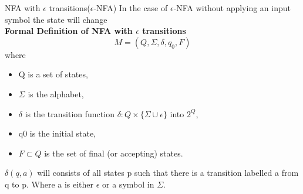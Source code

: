 \documentclass{beamer}
\begin{document}
\begin{frame}{NFA with $\epsilon$ transitions($\epsilon$-NFA)}
	In the case of $\epsilon$-NFA without applying an input symbol the state will change
	\\
	\textbf{Formal Definition of NFA with $\epsilon$ transitions}
	$$ 	M=(Q,\Sigma,\delta,q_0,F) $$
	where
	\begin{itemize}
		\item Q is a set of states,
		\item $\Sigma$ is the alphabet, 
		\item $\delta$ is the transition function $\delta: Q\times \{\Sigma \cup \epsilon \} $ into $2^Q$, 
		\item q0 is the initial state,
		\item $F\subset Q$ is the set of final (or accepting) states.
	\end{itemize}
$\delta(q,a)$ will consists of all states p such that there is a transition labelled a from q to p. Where a is either $\epsilon$ or a symbol in $\Sigma$.
\end{frame}
\end{document}
